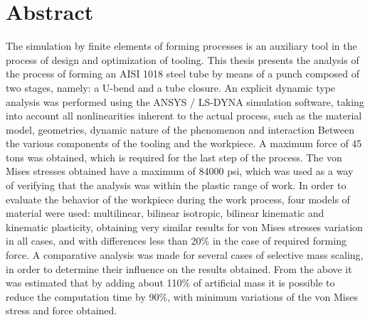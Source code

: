 \chapter*{Abstract}

The simulation by finite elements of forming processes is an auxiliary tool in the process of design and optimization of tooling. This thesis presents the analysis of the process of forming an AISI 1018 steel tube by means of a punch composed of two stages, namely: a U-bend and a tube closure. An explicit dynamic type analysis was performed using the ANSYS / LS-DYNA simulation software, taking into account all nonlinearities inherent to the actual process, such as the material model, geometries, dynamic nature of the phenomenon and interaction Between the various components of the tooling and the workpiece. A maximum force of 45 tons was obtained, which is required for the last step of the process. The von Mises stresses obtained have a maximum of 84000 psi, which was used as a way of verifying that the analysis was within the plastic range of work. In order to evaluate the behavior of the workpiece during the work process, four models of material were used: multilinear, bilinear isotropic, bilinear kinematic and kinematic plasticity, obtaining very similar results for von Mises stresses variation in all cases, and with differences less than 20\% in the case of required forming force. A comparative analysis was made for several cases of selective mass scaling, in order to determine their influence on the results obtained. From the above it was estimated that by adding about 110\% of artificial mass it is possible to reduce the computation time by 90\%, with minimum variations of the von Mises stress and force obtained.